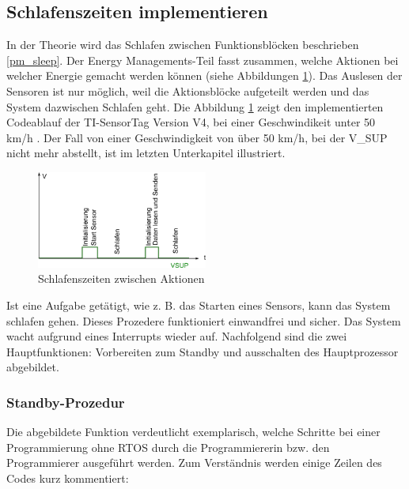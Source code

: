 \subsection{Schlafenszeiten implementieren}
\label{sleep_funktion}

In der Theorie wird das Schlafen zwischen Funktionsblöcken beschrieben \ref{pm_sleep}. Der Energy Managements-Teil fasst zusammen, welche Aktionen bei welcher Energie gemacht werden können (siehe Abbildungen \ref{warten_zw_bloecken}). Das Auslesen der Sensoren ist nur möglich, weil die Aktionsblöcke aufgeteilt werden und das System dazwischen Schlafen geht. Die Abbildung \ref{warten_zw_bloecken} zeigt den implementierten Codeablauf der TI-SensorTag Version V4, bei einer Geschwindikeit unter 50 km/h . Der Fall von einer Geschwindigkeit von über 50 km/h, bei der V\_SUP nicht mehr abstellt, ist im letzten Unterkapitel illustriert.

\begin{figure}[ht]
  \includegraphics[width=0.5\textwidth]{3Vorgehen/imag/schlafen_funktionen.png}
  \caption{Schlafenszeiten zwischen Aktionen}
  \label{warten_zw_bloecken}
\end{figure}

Ist eine Aufgabe getätigt, wie z. B. das Starten eines Sensors, kann das System schlafen gehen. Dieses Prozedere funktioniert einwandfrei und sicher. Das System wacht aufgrund eines Interrupts wieder auf. Nachfolgend sind die zwei Hauptfunktionen: Vorbereiten zum Standby und ausschalten des Hauptprozessor abgebildet.

\subsubsection{Standby-Prozedur}
\label{vorbereiten}

Die abgebildete Funktion verdeutlicht exemplarisch, welche Schritte bei einer Programmierung ohne RTOS durch die Programmiererin bzw. den Programmierer ausgeführt werden.  Zum Verständnis werden einige Zeilen des Codes kurz kommentiert:\\ 


